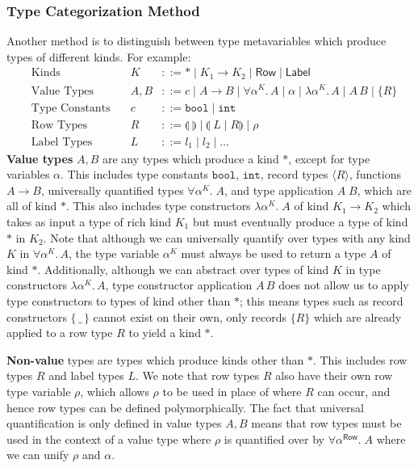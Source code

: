 \documentclass[acmsmall, 9pt]{article}
\begin{document}
\subsubsection{Type Categorization Method}
\label{sssec:type-categorization-method}
Another method is to distinguish between type metavariables which produce types of different kinds. For example:
\begin{align*}
&\text{Kinds} \quad &K &::= * \; | \; K_1 \rightarrow K_2 \; | \; \mathsf{Row} \; | \; \mathsf{Label}\\
&\text{Value Types} \quad  &A, B &::= c \; | \; A \rightarrow B \; | \; \forall \alpha^K . \, A\; | \; \alpha \; | \; \lambda \alpha^K. \, A \; | \; A \, B \; | \; \{ R \} \\
&\text{Type Constants} \quad &c &::= \texttt{bool} \; | \; \texttt{int}\\
&\text{Row Types} \quad &R &::= \llparenthesis \; \rrparenthesis \; | \; \llparenthesis \; L \; | \; R \rrparenthesis \; | \; \rho \\
&\text{Label Types} \quad &L &::= l_1 \; | \; l_2 \; | \; \ldots
\end{align*}
\textbf{Value types} $A,B$ are any types which produce a kind $*$, except for type variables $\alpha$. This includes type constants $\texttt{bool}$, $\texttt{int}$, record types $\langle R \rangle$, functions $A \rightarrow B$, universally quantified types $\forall \alpha^K . \; A$, and type application $A\;B$, which are all of kind $*$. This also includes type constructors $\lambda \alpha^K. \; A$ of kind $K_1 \rightarrow K_2$ which takes as input a type of rich kind $K_1$ but must eventually produce a type of kind $*$ in $K_2$. Note that although we can universally quantify over types with any kind $K$ in $\forall \alpha^K. \, A$, the type variable $\alpha^K$ must always be used to return a type $A$ of kind $*$. Additionally, although we can abstract over types of kind $K$ in type constructors $\lambda \alpha^K. \, A$, type constructor application $A\,B$ does not allow us to apply type constructors to types of kind other than $*$; this means types such as record constructors $\{ \, \_ \, \}$ cannot exist on their own, only records $\{ R \}$ which are already applied to a row type $R$ to yield a kind $*$.

\textbf{Non-value} types are types which produce kinds other than $*$. This includes row types $R$ and label types $L$. We note that row types $R$ also have their own row type variable $\rho$, which allows $\rho$ to be used in place of where $R$ can occur, and hence row types can be defined polymorphically. The fact that universal quantification is only defined in value types $A, B$ means that row types must be used in the context of a value type where $\rho$ is quantified over by $\forall \alpha^\mathsf{Row} . \; A$ where we can unify $\rho$ and $\alpha$.
\end{document}
